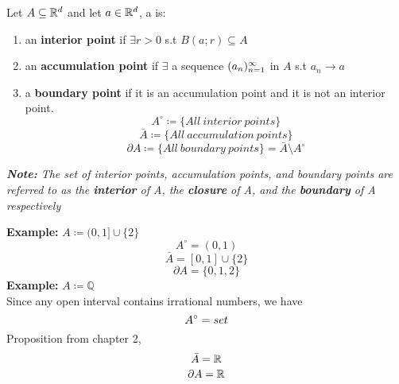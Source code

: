 \documentclass[openany]{report}
\begin{document}
\begin{definition}
    Let $A \subseteq \mathbb{R}^d$ and let $a \in \mathbb{R}^d$, a is: 
    \begin{enumerate}[label=(\roman*)]
        \item an \textbf{interior point} if $\exists r > 0$ s.t $B(a;r) \subseteq A$
        \item an \textbf{accumulation point} if $\exists$ a sequence $({a}_n)_{n=1}^\infty$ in $A$ s.t $a_n \rightarrow a$
        \item a \textbf{boundary point} if it is an accumulation point and it is not an interior point.
        $$A^\circ \coloneqq \{All \ interior \ points\}$$
        $$\bar{A} \coloneqq \{All \ accumulation \ points\}$$
        $$\partial A \coloneqq \{All \  boundary 
 \ points\} = \bar{A} \setminus A^\circ$$
    \end{enumerate}
    \begin{center}
        \textit{\textbf{Note:} The set of interior points, accumulation points, and boundary points are referred to as the \textbf{interior} of A, the \textbf{closure} of A, and the \textbf{boundary} of A respectively}
    \end{center}
\end{definition}
\textbf{Example:} $A \coloneqq (0, 1] \cup \{2\}$\\[1ex]
$$A^\circ = (0,1)$$
$$\bar{A} = [0,1] \cup \{2\}$$
$$\partial A = \{0,1,2\}$$
\textbf{Example:} $A \coloneqq \mathbb{Q}$\\[1ex]
Since any open interval contains irrational numbers, we have
$$A^\circ = \empty set$$
Proposition from chapter 2,
$$\bar{A} = \mathbb{R}$$
$$\partial A = \mathbb{R}$$
\end{document}
